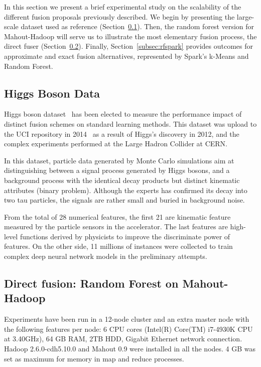 \documentclass[3p,review]{elsarticle}
\begin{document}
In this section we present a brief experimental study on the scalability of the different fusion proposals previously described. We begin by presenting the large-scale dataset used as reference (Section~\ref{subsec:datasets}). Then, the random forest version for Mahout-Hadoop will serve us to illustrate the most elementary fusion process, the direct fuser (Section~\ref{subsec:rfmahout}). Finally, Section~\ref{subsec:rfspark} provides outcomes for approximate and exact fusion alternatives, represented by Spark's k-Means and Random Forest.

\subsection{Higgs Boson Data}
\label{subsec:datasets}

Higgs boson dataset~\cite{baldi14} has been elected to measure the performance impact of distinct fusion schemes on standard learning methods. This dataset was upload to the UCI repository in 2014~\cite{Lichman:2013} as a result of Higgs's discovery in 2012, and the complex experiments performed at the Large Hadron Collider at CERN. %

In this dataset, particle data generated by Monte Carlo simulations aim at distinguishing between a signal process generated by Higgs bosons, and a background process with the identical decay products but distinct kinematic attributes (binary problem). Although the experts has confirmed its decay into two tau particles, the signals are rather small and buried in background noise. 

From the total of 28 numerical features, the first 21 are kinematic feature measured by the particle sensors in the accelerator. The last features are high-level functions derived by physicists to improve the discriminate power of features. On the other side, 11 millions of instances were collected to train complex deep neural network models in the preliminary attempts.

\subsection{Direct fusion: Random Forest on Mahout-Hadoop}
\label{subsec:rfmahout}



Experiments have been run in a 12-node cluster and an extra master node with the following features per node: 6 CPU cores (Intel(R) Core(TM) i7-4930K CPU at 3.40GHz), 64 GB RAM, 2TB HDD, Gigabit Ethernet network connection. Hadoop 2.6.0-cdh5.10.0 and Mahout 0.9 were installed in all the nodes. 4 GB was set as maximum for memory in map and reduce processes.
\end{document}
